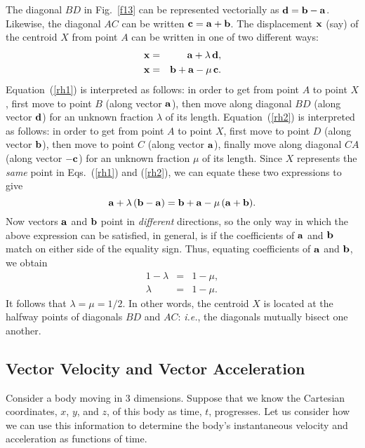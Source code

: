 The diagonal $BD$ in Fig.~\ref{f13} can be represented vectorially as ${\bf d} = {\bf b} - {\bf a}$.
Likewise, the diagonal $AC$ can be written ${\bf c} = {\bf a} + {\bf b}$. 
The displacement ${\bf x}$ (say) of the centroid $X$ from point $A$ can be written in one
of two different ways:
\begin{eqnarray}
{\bf x} &=& {\bf a} + \lambda\,{\bf d},\label{rh1}\\
{\bf x} &=& {\bf b} + {\bf a} - \mu \,{\bf c}.\label{rh2}
\end{eqnarray}
Equation~(\ref{rh1}) is interpreted as follows: in order to get from point $A$ to point $X$,
first move to point $B$ (along vector ${\bf a}$), then move along diagonal $BD$ (along
vector ${\bf d}$) for an unknown fraction $\lambda$ of its length. 
Equation~(\ref{rh2}) is interpreted as follows: in order to get from point $A$ to point
$X$, first move to point $D$ (along vector ${\bf b}$), then move to point $C$
(along vector ${\bf a}$), finally move along diagonal $CA$ (along vector
$-{\bf c}$) for an unknown fraction $\mu$ of its length. Since $X$ represents the
{\em same} point in Eqs.~(\ref{rh1}) and (\ref{rh2}), we can equate these two
expressions to give
\begin{equation}
{\bf a} + \lambda\,({\bf b} - {\bf a}) =  {\bf b} + {\bf a} - \mu \,({\bf a} + {\bf b}).
\end{equation}
Now vectors ${\bf a}$ and ${\bf b}$ point in {\em different} directions, so the only way
in which the above expression can be satisfied, in general,  is if the coefficients of
${\bf a}$ and ${\bf b}$ match on either side of the equality sign. Thus,
equating coefficients of ${\bf a}$ and ${\bf b}$, we obtain
\begin{eqnarray}
1 - \lambda &=& 1 - \mu,\\
\lambda &=& 1 -\mu.
\end{eqnarray}
It follows that $\lambda=\mu =1/2$. In other words, the centroid $X$ is located at
the halfway points of diagonals $BD$ and $AC$: {\em i.e.}, the diagonals
mutually bisect one another.

\subsection{Vector Velocity and Vector Acceleration}
Consider a body moving in 3 dimensions. Suppose that we know the Cartesian
coordinates, $x$, $y$, and $z$, of this body as  time, $t$, progresses. 
Let us consider how we can use this information to determine the body's instantaneous
velocity and acceleration as functions of time.

